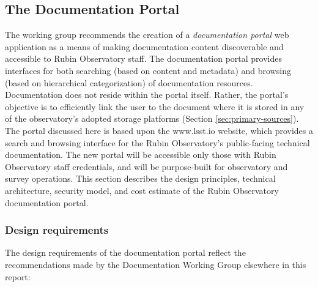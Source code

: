 \subsection{The Documentation Portal}
\label{sec:DocPortal}

The working group recommends the creation of a \emph{documentation portal} web application as a means of making documentation content discoverable and accessible to Rubin Observatory staff.
The documentation portal provides interfaces for both searching (based on content and metadata) and browsing (based on hierarchical categorization) of documentation resources. Documentation does not reside within the portal itself.
Rather, the portal's objective is to efficiently link the user to the document where it is stored in any of the observatory's adopted storage platforms (Section \ref{sec:primary-sources}).
The portal discussed here is based upon the www.lsst.io website, which provides a search and browsing interface for the Rubin Observatory's public-facing technical documentation.
The new portal will be accessible only those with Rubin Observatory staff credentials, and will be purpose-built for observatory and survey operations.
This section describes the design principles, technical architecture, security model, and cost estimate of the Rubin Observatory documentation portal.

\subsubsection{Design requirements}

The design requirements of the documentation portal reflect the recommendations made by the Documentation Working Group elsewhere in this report:

